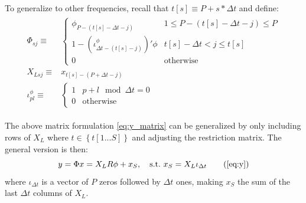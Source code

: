 \documentclass[11pt]{article}
\begin{document}
To generalize to other frequencies, recall that $t\left[s\right]\equiv P+s*\Delta t$ and define:
\begin{align}
\begin{split}
	\Phi_{sj}	\equiv	&\begin{cases}
						\phi_{P-\left(t\left[s\right]-\Delta t-j\right)} & 1\le P-(t\left[s\right]-\Delta t-j)\le P\\
						1-\left(\iota_{\Delta t-\left(t\left[s\right]-j\right)}^{\phi}\right)'\phi & t\left[s\right]-\Delta t<j\le t\left[s\right]\\
						0 & \text{otherwise}	
					\end{cases} \\
	X_{Lsj}	\equiv	&x_{t\left[s\right]-\left(P+\Delta t-j\right)}	\\	
	\iota_{pl}^{\phi}
			\equiv	&\begin{cases}
						1 & p+l\mod\Delta t=0\\
						0 & \text{otherwise}
					\end{cases} 
\end{split}
\end{align}

The above matrix formulation \eqref{eq:y_matrix} can be generalized by only including rows of $X_{L}$ where $t\in\left\{ t\left[1...S\right]\right\}$ and adjusting the restriction matrix. The general version is then:
\begin{equation}
	y=\Phi x =	X_{L}R\phi+x_{S}, \quad \text{s.t.~} x_{S} =	X_{L}\iota_{\Delta t} \tag{\ref{eq:y}}
\end{equation}
where $\iota_{\Delta t}$ is a vector of $P$ zeros followed by $\Delta t$ ones, making $x_{S}$ the sum of the last $\Delta t$ columns of $X_{L}$.
\end{document}
